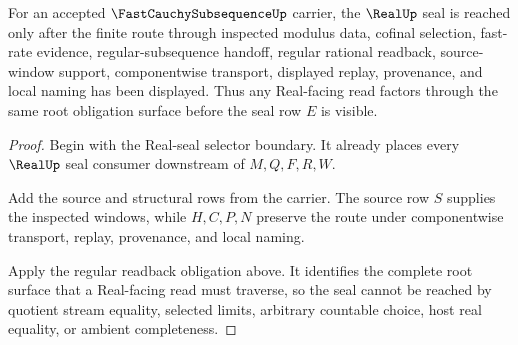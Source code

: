\begin{theorem}
\label{thm:fast-cauchy-subsequence-real-seal}
For an accepted $\FastCauchySubsequenceUp$ carrier, the $\RealUp$ seal is reached only after the finite route through inspected modulus data, cofinal selection, fast-rate evidence, regular-subsequence handoff, regular rational readback, source-window support, componentwise transport, displayed replay, provenance, and local naming has been displayed. Thus any Real-facing read factors through the same root obligation surface before the seal row $E$ is visible.
\end{theorem}
\begin{proof}
Begin with the Real-seal selector boundary. It already places every $\RealUp$ seal consumer downstream of $M,Q,F,R,W$.

Add the source and structural rows from the carrier. The source row $S$ supplies the inspected windows, while $H,C,P,N$ preserve the route under componentwise transport, replay, provenance, and local naming.

Apply the regular readback obligation above. It identifies the complete root surface that a Real-facing read must traverse, so the seal cannot be reached by quotient stream equality, selected limits, arbitrary countable choice, host real equality, or ambient completeness.
\end{proof}

